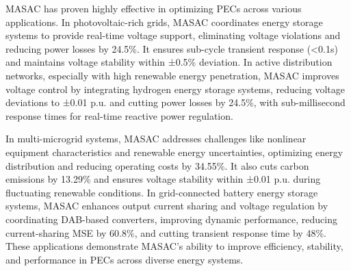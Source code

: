 MASAC has proven highly effective in optimizing PECs across various applications. In photovoltaic-rich grids, MASAC coordinates energy storage systems to provide real-time voltage support, eliminating voltage violations and reducing power losses by 24.5\%. It ensures sub-cycle transient response (<0.1s) and maintains voltage stability within ±0.5\% deviation. In active distribution networks, especially with high renewable energy penetration, MASAC improves voltage control by integrating hydrogen energy storage systems, reducing voltage deviations to ±0.01 p.u. and cutting power losses by 24.5\%, with sub-millisecond response times for real-time reactive power regulation.

In multi-microgrid systems, MASAC addresses challenges like nonlinear equipment characteristics and renewable energy uncertainties, optimizing energy distribution and reducing operating costs by 34.55\%. It also cuts carbon emissions by 13.29\% and ensures voltage stability within ±0.01 p.u. during fluctuating renewable conditions. In grid-connected battery energy storage systems, MASAC enhances output current sharing and voltage regulation by coordinating DAB-based converters, improving dynamic performance, reducing current-sharing MSE by 60.8\%, and cutting transient response time by 48\%. These applications demonstrate MASAC's ability to improve efficiency, stability, and performance in PECs across diverse energy systems.



